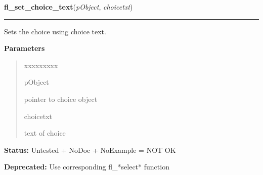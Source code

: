\hspace{.8\funcindent}\begin{boxedminipage}{\funcwidth}

    \raggedright \textbf{fl\_set\_choice\_text}(\textit{pObject}, \textit{choicetxt})

    \vspace{-1.5ex}

    \rule{\textwidth}{0.5\fboxrule}
\setlength{\parskip}{2ex}
    Sets the choice using choice text.

\setlength{\parskip}{1ex}
      \textbf{Parameters}
      \vspace{-1ex}

      \begin{quote}
        \begin{Ventry}{xxxxxxxxx}

          \item[pObject]

          pointer to choice object

          \item[choicetxt]

          text of choice

        \end{Ventry}

      \end{quote}

\textbf{Status:} Untested + NoDoc + NoExample = NOT OK



\textbf{Deprecated:} Use corresponding fl\_*select* function



    \end{boxedminipage}

    \label{xformslib:deprecated:fl_get_choice}

    \vspace{0.5ex}

